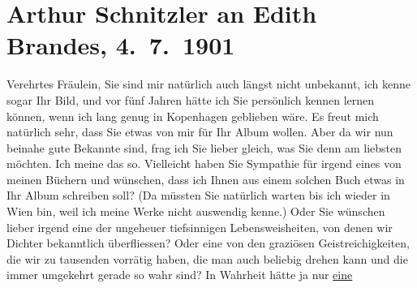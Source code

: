 

         
         \renewcommand{\erwaehntePersonen}{Personen: Georg Brandes, Edith Philipp}
         \renewcommand{\erwaehnteOrte}{Orte: Kopenhagen, St. Anton am Arlberg, Wien}
         \renewcommand{\erwaehnteWerke}{}
               \section[Arthur Schnitzler an Edith Brandes, 4. 7. 1901]{ Arthur Schnitzler an Edith Brandes, 4. 7. 1901}\nopagebreak{}\rehead{ }\begin{ledgroupsized}[t]{13cm}\normalsize\beginnumbering{} \toendnotes[C]{\smallbreak\pagebreak[2]} 
\toendnotes[C]{\smallbreak}\pstart{}{\pb}Verehrtes Fräulein,\pend\pstart
           Sie sind mir natürlich auch längst nicht unbekannt, ich kenne sogar Ihr Bild, und vor
               fünf Jahren hätte ich Sie persönlich kennen lernen können, wenn ich lang genug in Kopenhagen geblieben wäre. Es freut mich
               natürlich sehr, dass Sie etwas von mir für Ihr Album wollen. Aber da wir nun beinahe
               gute Bekannte sind, frag ich Sie lieber gleich, was Sie denn am liebsten möchten. Ich
               meine das so. Vielleicht haben Sie Sympathie für irgend eines von meinen Büchern und
               wünschen, dass ich Ihnen aus einem solchen Buch etwas in Ihr Album schreiben soll?
               (Da müssten Sie natürlich warten bis ich wieder in Wien bin, weil ich meine Werke nicht auswendig kenne.) Oder Sie wünschen
               lieber irgend eine der ungeheuer tiefsinnigen Lebensweisheiten, von denen wir Dichter
               bekanntlich überfliessen? Oder eine von den graziösen Geistreichigkeiten, die wir zu
               tausenden vorrätig haben, die man auch beliebig drehen kann und die immer umgekehrt
               gerade so wahr sind? In Wahrheit hätte ja nur \uline{eine}

\end{ledgroupsized}
